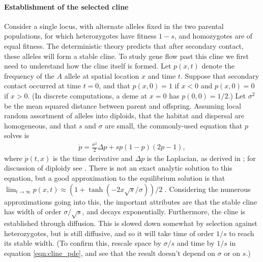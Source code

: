 \documentclass[12pt]{article}
\begin{document}
\paragraph{Establishment of the selected cline}
Consider a single locus, with alternate alleles fixed in the two parental populations,
for which heterozygotes have fitness $1-s$, and homozygotes are of equal fitness.
The deterministic theory predicts that after secondary contact,
these alleles will form a stable cline.
To study gene flow past this cline we first need to understand how the cline itself is formed.
Let $p(x,t)$ denote the frequency of the $A$ allele at spatial location $x$ and time $t$.  
Suppose that secondary contact occurred at time $t=0$, 
and that $p(x,0) = 1$ if $x<0$ and $p(x,0)=0$ if $x>0$.
(In discrete computations, a deme at $x=0$ has $p(0,0)=1/2$.)
Let $\sigma^2$ be the mean squared distance between parent and offspring.
Assuming local random assortment of alleles into diploids,
that the habitat and dispersal are homogeneous,
and that $s$ and $\sigma$ are small, 
the commonly-used equation that $p$ solves is
\begin{align} \label{eqn:cline_pde}
    \dot p = \frac{\sigma^2}{2} \Delta p + s p (1-p) (2p-1) ,
\end{align}
where $\dot p(t,x)$ is the time derivative and $\Delta p$ is the Laplacian,
as derived in \citep{bazykin}; for discussion of diploidy see \citep{diploidcline}.
There is not an exact analytic solution to this equation, 
but a good approximation to the equilibrium solution is that
$\lim_{t \to \infty} p(x,t) \approx (1+\tanh(-2x\sqrt{s}/\sigma))/2$ \citep{bazykin}.
Considering the numerous approximations going into this,
the important attributes are that 
the stable cline has width of order $\sigma/\sqrt{s}$,
and decays exponentially.
Furthermore, the cline is established through diffusion.
This is slowed down somewhat by selection against heterozygotes,
but is still diffusive, and so it will take time of order $1/s$
to reach its stable width.
(To confirm this, 
rescale space by $\sigma/s$ and time by $1/s$ in equation \eqref{eqn:cline_pde},
and see that the result doesn't depend on $\sigma$ or on $s$.)
\end{document}
